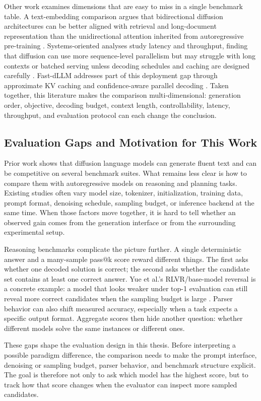 Other work examines dimensions that are easy to miss in a single benchmark
table. A text-embedding comparison argues that bidirectional diffusion
architectures can be better aligned with retrieval and long-document
representation than the unidirectional attention inherited from autoregressive
pre-training \cite{zhang2025embedding}. Systems-oriented analyses study latency
and throughput, finding that diffusion can use more sequence-level parallelism
but may struggle with long contexts or batched serving unless decoding schedules
and caching are designed carefully \cite{kim2025beyond}. Fast-dLLM addresses
part of this deployment gap through approximate KV caching and confidence-aware
parallel decoding \cite{wu2025fastdllm}. Taken together, this literature makes
the comparison multi-dimensional: generation order, objective, decoding budget,
context length, controllability, latency, throughput, and evaluation protocol
can each change the conclusion.

\subsection{Evaluation Gaps and Motivation for This Work}
Prior work shows that diffusion language models can generate fluent text and
can be competitive on several benchmark suites. What remains less clear is how
to compare them with autoregressive models on reasoning and planning tasks.
Existing studies often vary model size, tokenizer, initialization, training
data, prompt format, denoising schedule, sampling budget, or inference backend
at the same time. When those factors move together, it is hard to tell whether
an observed gain comes from the generation interface or from the surrounding
experimental setup.

Reasoning benchmarks complicate the picture further. A single deterministic
answer and a many-sample pass@k score reward different things. The first asks
whether one decoded solution is correct; the second asks whether the candidate
set contains at least one correct answer. Yue et al.'s RLVR/base-model reversal
is a concrete example: a model that looks weaker under top-1 evaluation can
still reveal more correct candidates when the sampling budget is large
\cite{yue2025rlvr}. Parser behavior can also shift measured accuracy,
especially when a task expects a specific output format. Aggregate scores then
hide another question: whether different models solve the same instances or
different ones.

These gaps shape the evaluation design in this thesis. Before interpreting a
possible paradigm difference, the comparison needs to make the prompt interface,
denoising or sampling budget, parser behavior, and benchmark structure explicit.
The goal is therefore not only to ask which model has the highest score, but to
track how that score changes when the evaluator can inspect more sampled
candidates.
